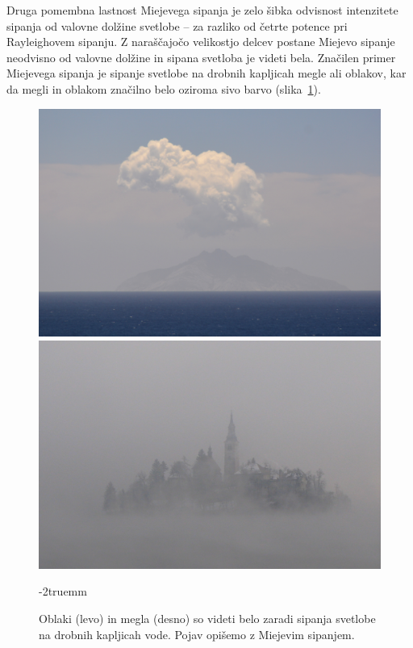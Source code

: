 Druga pomembna lastnost Miejevega sipanja je zelo šibka odvisnost intenzitete
sipanja od valovne dolžine svetlobe -- za razliko od četrte potence pri Rayleighovem
sipanju. Z naraščajočo velikostjo delcev postane Miejevo sipanje neodvisno od valovne dolžine
in sipana svetloba je videti bela. Značilen primer Miejevega 
sipanja je sipanje svetlobe na drobnih kapljicah megle ali oblakov, kar da 
megli in oblakom značilno belo oziroma sivo barvo (slika~\ref{fig:07_Mie}).
\begin{figure}[!ht]
\centering
\includegraphics[width=7truecm]{slike/07_oblak.jpg}\hfill
\includegraphics[width=7truecm]{slike/07_meglaB.jpg}
\caption{Oblaki (levo) in megla (desno) so videti belo zaradi sipanja svetlobe
na drobnih kapljicah vode. Pojav opišemo z Miejevim sipanjem.}
\label{fig:07_Mie}
\vglue-2truemm
\end{figure}

